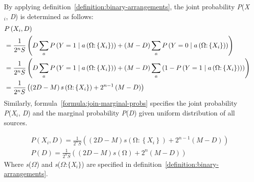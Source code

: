 \documentclass{article}
\numberwithin{equation}{section}
\numberwithin{figure}{section}
\numberwithin{table}{section}
\begin{document}
By applying definition~\ref{definition:binary-arrangements}, the joint probability \textit{P}(\textit{X${}_{i}$}, \textit{D}) is determined as follows:
\begin{align*}
&P\left(X_i,D\right)\\
&=\frac{1}{2^nS}\left(D\sum_a{P\left(Y=1\mathrel{\left|\vphantom{Y=1 a\left(\mathrm{\Omega }\mathrm{:}\left\{X_i\right\}\right)}\right.\kern-\nulldelimiterspace}a\left(\mathrm{\Omega }\mathrm{:}\left\{X_i\right\}\right)\right)}+\left(M-D\right)\sum_a{P\left(Y=0\mathrel{\left|\vphantom{Y=0 a\left(\mathrm{\Omega }\mathrm{:}\left\{X_i\right\}\right)}\right.\kern-\nulldelimiterspace}a\left(\mathrm{\Omega }\mathrm{:}\left\{X_i\right\}\right)\right)}\right)\\
&=\frac{1}{2^nS}\left(D\sum_a{P\left(Y=1\mathrel{\left|\vphantom{Y=1 a\left(\mathrm{\Omega }\mathrm{:}\left\{X_i\right\}\right)}\right.\kern-\nulldelimiterspace}a\left(\mathrm{\Omega }\mathrm{:}\left\{X_i\right\}\right)\right)}+\left(M-D\right)\sum_a{\left(1-P\left(Y=1\mathrel{\left|\vphantom{Y=1 a\left(\mathrm{\Omega }\mathrm{:}\left\{X_i\right\}\right)}\right.\kern-\nulldelimiterspace}a\left(\mathrm{\Omega }\mathrm{:}\left\{X_i\right\}\right)\right)\right)}\right)\\
&=\frac{1}{2^nS}\left(\left(2D-M\right)s\left(\mathrm{\Omega }\mathrm{:}\left\{X_i\right\}\right)+2^{n-1}\left(M-D\right)\right)
\end{align*}
Similarly, formula~\ref{formula:join-marginal-probs} specifies the joint probability \textit{P}(\textit{X${}_{i}$}, \textit{D}) and the marginal probability \textit{P}(\textit{D}) given uniform distribution of all sources.

\begin{equation}
\begin{split}
&P\left(X_i,D\right)=\frac{1}{2^nS}\left(\left(2D-M\right)s\left(\mathrm{\Omega }\mathrm{:}\left\{X_i\right\}\right)+2^{n-1}\left(M-D\right)\right)\\
&P\left(D\right)=\frac{1}{2^nS}\left(\left(2D-M\right)s\left(\mathrm{\Omega }\right)+2^n\left(M-D\right)\right)
\end{split}
\label{formula:join-marginal-probs}
\end{equation}
Where \textit{s}($\Omega$) and \textit{s}($\Omega$:$\{$\textit{X${}_{i}$}$\}$) are specified in definition~\ref{definition:binary-arrangements}.
\end{document}
